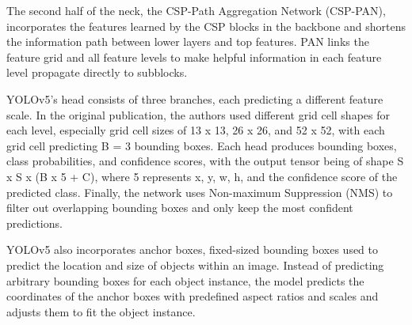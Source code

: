 \documentclass[10pt,twocolumn,letterpaper]{article}
\begin{document}
The second half of the neck, the CSP-Path Aggregation Network (CSP-PAN), incorporates the features learned by the CSP blocks in the backbone and shortens the information path between lower layers and top features. PAN links the feature grid and all feature levels to make helpful information in each feature level propagate directly to subblocks. 

YOLOv5’s head consists of three branches, each predicting a different feature scale. In the original publication, the authors used different grid cell shapes for each level, especially grid cell sizes of 13 x 13, 26 x 26, and 52 x 52, with each grid cell predicting B = 3 bounding boxes. Each head produces bounding boxes, class probabilities, and confidence scores, with the output tensor being of shape S x S x (B x 5 + C), where 5 represents x, y, w, h, and the confidence score of the predicted class. Finally, the network uses Non-maximum Suppression (NMS) to filter out overlapping bounding boxes and only keep the most confident predictions.

YOLOv5 also incorporates anchor boxes, fixed-sized bounding boxes used to predict the location and size of objects within an image. Instead of predicting arbitrary bounding boxes for each object instance, the model predicts the coordinates of the anchor boxes with predefined aspect ratios and scales and adjusts them to fit the object instance.
\end{document}
